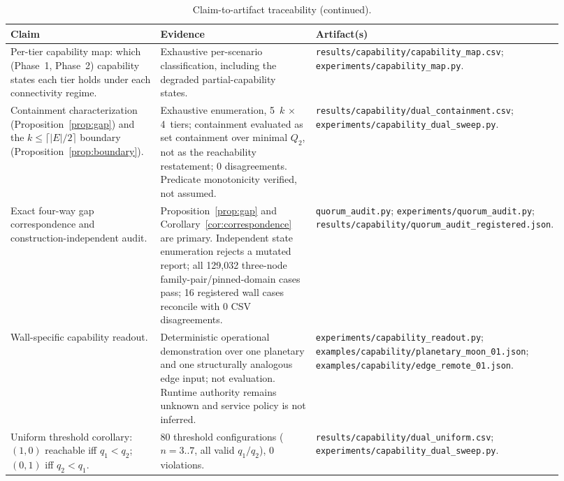 \documentclass[letterpaper,twocolumn,10pt]{article}
\newcounter{prop}
\newcounter{cor}
\begin{document}
\begin{table}[t]
\centering
\footnotesize
\renewcommand{\arraystretch}{0.94}
\setlength{\tabcolsep}{4pt}
\caption{Claim-to-artifact traceability (continued).}
\begin{tabular}{p{0.28\linewidth}p{0.30\linewidth}p{0.34\linewidth}}
\toprule
Claim & Evidence & Artifact(s) \\
\midrule
Per-tier capability map: which (Phase~1, Phase~2) capability states each tier holds under each connectivity regime. & Exhaustive per-scenario classification, including the degraded partial-capability states. & \texttt{results/capability/\allowbreak capability\_map.csv}; \texttt{experiments/\allowbreak capability\_map.py}. \\
Containment characterization (Proposition~\ref{prop:gap}) and the $k \le \lceil |E|/2 \rceil$ boundary (Proposition~\ref{prop:boundary}). & Exhaustive enumeration, 5~$k$ $\times$ 4~tiers; containment evaluated as set containment over minimal $Q_2$, not as the reachability restatement; 0 disagreements. Predicate monotonicity verified, not assumed. & \texttt{results/capability/\allowbreak dual\_containment.csv}; \texttt{experiments/\allowbreak capability\_dual\_sweep.py}. \\
Exact four-way gap correspondence and construction-independent audit. & Proposition~\ref{prop:gap} and Corollary~\ref{cor:correspondence} are primary. Independent state enumeration rejects a mutated report; all 129{,}032 three-node family-pair/pinned-domain cases pass; 16 registered wall cases reconcile with 0 CSV disagreements. & \texttt{quorum\_audit.py}; \texttt{experiments/\allowbreak quorum\_audit.py}; \texttt{results/capability/\allowbreak quorum\_audit\_registered.json}. \\
Wall-specific capability readout. & Deterministic operational demonstration over one planetary and one structurally analogous edge input; not evaluation. Runtime authority remains unknown and service policy is not inferred. & \texttt{experiments/\allowbreak capability\_readout.py}; \texttt{examples/capability/\allowbreak planetary\_moon\_01.json}; \texttt{examples/capability/\allowbreak edge\_remote\_01.json}. \\
Uniform threshold corollary: $(1,0)$ reachable iff $q_1 < q_2$; $(0,1)$ iff $q_2 < q_1$. & 80 threshold configurations ($n = 3..7$, all valid $q_1/q_2$), 0 violations. & \texttt{results/capability/\allowbreak dual\_uniform.csv}; \texttt{experiments/\allowbreak capability\_dual\_sweep.py}. \\

\end{tabular}
\end{table}
\end{document}
